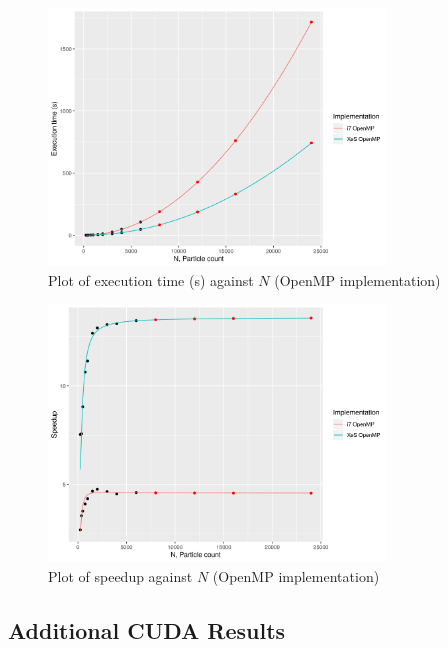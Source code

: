 \documentclass[12pt]{article}
\begin{document}
\begin{figure}[H]
    \centering
    \includegraphics[width=0.8\textwidth]{processedCpuResults/parExtrapolate.png}
    \caption{Plot of execution time (s) against $N$ (OpenMP implementation)}
    \label{fig:parExtrapolate}
\end{figure}

\begin{figure}[H]
    \centering
    \includegraphics[width=0.8\textwidth]{processedCpuResults/parSpeedupExtrapolate.png}
    \caption{Plot of speedup against $N$ (OpenMP implementation)}
    \label{fig:parSpeedupExtrapolate}
\end{figure}

\subsection{Additional CUDA Results}
\end{document}
